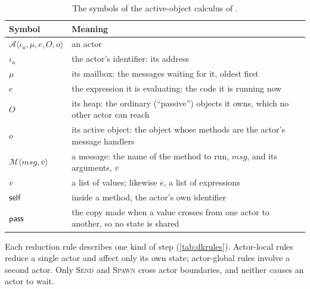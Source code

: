 \documentclass[11pt]{article}
\newcommand{\rowsep}{\specialrule{0.3pt}{1.5pt}{1.5pt}}
\theoremstyle{definition}
\theoremstyle{remark}
\newcommand{\Act}[1]{\mathcal{A}\langle #1\rangle}
\newcommand{\Msg}[1]{\mathcal{M}\langle #1\rangle}
\newcommand{\pass}{\mathsf{pass}}
\begin{document}
\begin{table}[t]
\centering
\caption{The symbols of the active-object calculus of \cite{dekoster2024}.}
\label{tab:dksymbols}
\small
\begin{tabular}{@{}lP{11.5cm}@{}}
\toprule
Symbol & Meaning \\
\midrule
$\Act{\iota_a, \mu, e, O, o}$ & an actor \\ \rowsep
$\iota_a$ & the actor's identifier: its address \\ \rowsep
$\mu$ & its mailbox: the messages waiting for it, oldest first \\ \rowsep
$e$ & the expression it is evaluating: the code it is running now \\ \rowsep
$O$ & its heap: the ordinary (``passive'') objects it owns, which no other actor can reach \\ \rowsep
$o$ & its active object: the object whose methods are the actor's message handlers \\ \rowsep
$\Msg{msg, \overline{v}}$ & a message: the name of the method to run, $msg$, and its arguments, $\overline{v}$ \\ \rowsep
$\overline{v}$ & a list of values; likewise $\overline{e}$, a list of expressions \\ \rowsep
$\mathsf{self}$ & inside a method, the actor's own identifier \\ \rowsep
$\pass$ & the copy made when a value crosses from one actor to another, so no state is shared \\
\bottomrule
\end{tabular}
\end{table}

Each reduction rule describes one kind of step (\cref{tab:dkrules}). Actor-local rules
reduce a single actor and affect only its own state; actor-global rules involve a second
actor. Only \textsc{Send} and \textsc{Spawn} cross actor boundaries, and neither causes
an actor to wait.
\end{document}
